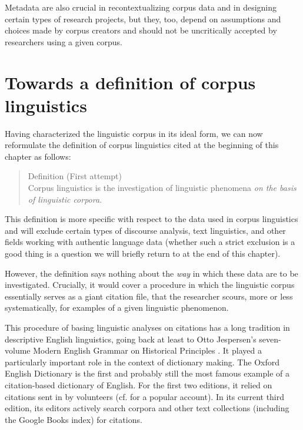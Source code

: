 Metadata are also crucial in recontextualizing corpus data and in designing certain types of research projects, but they, too, depend on assumptions and choices made by corpus creators and should not be uncritically accepted by researchers using a given corpus. 

\section{Towards a definition of corpus linguistics}
\label{sec:corpusdefinition}

Having characterized the linguistic corpus in its ideal form, we can now reformulate the definition of corpus linguistics cited at the beginning of this chapter as follows:

\begin{quotation}
Definition (First attempt) \\
Corpus linguistics is the investigation of linguistic phenomena \emph{on the basis of linguistic corpora}.
\end{quotation}

This definition is more specific with respect to the data used in corpus linguistics and will exclude certain types of discourse analysis, text linguistics, and other fields working with authentic language data (whether such a strict exclusion is a good thing is a question we will briefly return to at the end of this chapter).

However, the definition says nothing about the \emph{way} in which these data are to be investigated. Crucially, it would cover a procedure in which the linguistic corpus essentially serves as a giant citation file, that the researcher scours, more or less systematically, for examples of a given linguistic phenomenon.

This procedure of basing linguistic analyses on citations has a long tradition in descriptive English linguistics, going back at least to Otto Jespersen's seven-volume Modern English Grammar on Historical Principles \citep{jespersen_modern_1909}. It played a particularly important role in the context of dictionary making. The Oxford English Dictionary \citep{simpson_oxford_1989} is the first and probably still the most famous example of a citation-based dictionary of English. For the first two editions, it relied on citations sent in by volunteers (cf. \citealt{winchester_meaning_2003} for a popular account). In its current third edition, its editors actively search corpora and other text collections (including the Google Books index) for citations.

